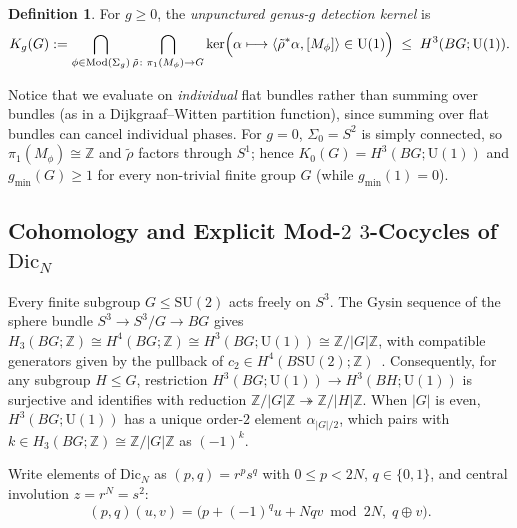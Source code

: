 \documentclass[11pt]{amsart}
\theoremstyle{definition}
\newtheorem{definition}[theorem]{Definition}
\theoremstyle{remark}
\newcommand{\Z}{\mathbb{Z}}
\newcommand{\U}{\mathrm{U}}
\newcommand{\SU}{\mathrm{SU}}
\newcommand{\Dic}{\mathrm{Dic}}
\newcommand{\Mod}{\mathrm{Mod}}
\begin{document}
\begin{definition}
For $g \ge 0$, the \emph{unpunctured genus-$g$ detection kernel} is
\[
    K_g(G) := \bigcap_{\phi\in \Mod(\Sigma_g)} \bigcap_{\tilde{\rho}\colon \pi_1(M_\phi)\to G} \ker\Bigl(\alpha \longmapsto \langle \tilde{\rho}^*\alpha, [M_\phi]\rangle \in \U(1)\Bigr) \;\le\; H^3(BG;\U(1)).
\]
\end{definition}
Notice that we evaluate on \emph{individual} flat bundles rather than summing over bundles (as in a Dijkgraaf--Witten partition function), since summing over flat bundles can cancel individual phases.
For $g=0$, $\Sigma_0 = S^2$ is simply connected, so $\pi_1(M_\phi)\cong \Z$ and $\tilde{\rho}$ factors through $S^1$; hence $K_0(G) = H^3(BG;\U(1))$ and $g_{\min}(G) \ge 1$ for every non-trivial finite group $G$ (while $g_{\min}(1)=0$).

\subsection{Cohomology and Explicit Mod-$2$ $3$-Cocycles of $\Dic_N$}
Every finite subgroup $G \le \SU(2)$ acts freely on $S^3$. The Gysin sequence of the sphere bundle $S^3 \to S^3/G \to BG$ gives $H_3(BG;\Z) \cong H^4(BG;\Z) \cong H^3(BG;\U(1)) \cong \Z/|G|\Z$, with compatible generators given by the pullback of $c_2 \in H^4(B\SU(2);\Z)$~\cite{EpaGanter2017}.
Consequently, for any subgroup $H \le G$, restriction $H^3(BG;\U(1)) \to H^3(BH;\U(1))$ is surjective and identifies with reduction $\Z/|G|\Z \twoheadrightarrow \Z/|H|\Z$.
When $|G|$ is even, $H^3(BG;\U(1))$ has a unique order-$2$ element $\alpha_{|G|/2}$, which pairs with $k \in H_3(BG;\Z) \cong \Z/|G|\Z$ as $(-1)^k$.

Write elements of $\Dic_N$ as $(p,q) = r^p s^q$ with $0 \le p < 2N$, $q \in \{0,1\}$, and central involution $z = r^N = s^2$:
\[
    (p,q)(u,v) = \bigl(p + (-1)^q u + Nqv \bmod 2N,\; q \oplus v\bigr).
\]
\end{document}
